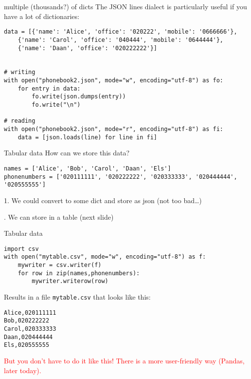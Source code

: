 \begin{frame}[fragile]{multiple (thousands?) of dicts}
The JSON lines dialect is particularly useful if you have a lot of dictionaries:

\begin{lstlisting}
data = [{'name': 'Alice', 'office': '020222', 'mobile': '0666666'},
	{'name': 'Carol', 'office': '040444', 'mobile': '0644444'},
	{'name': 'Daan', 'office': '020222222'}]


# writing
with open("phonebook2.json", mode="w", encoding="utf-8") as fo:
    for entry in data:
        fo.write(json.dumps(entry))
        fo.write("\n")
	
# reading
with open("phonebook2.json", mode="r", encoding="utf-8") as fi:
    data = [json.loads(line) for line in fi]
\end{lstlisting}

\end{frame}







\begin{frame}[fragile]{Tabular data}
How can we store this data?
\begin{lstlisting}
names = ['Alice', 'Bob', 'Carol', 'Daan', 'Els']
phonenumbers = ['020111111', '020222222', '020333333', '020444444', '020555555']
\end{lstlisting}
\pause

1. We could convert to some dict and store as json (not too bad\ldots)

. We can store in a table
(next slide)
\end{frame}

\begin{frame}[fragile]{Tabular data}
\begin{lstlisting}
import csv
with open("mytable.csv", mode="w", encoding="utf-8") as f:
    mywriter = csv.writer(f)
    for row in zip(names,phonenumbers):
        mywriter.writerow(row)
\end{lstlisting}
	
Results in a file \texttt{mytable.csv} that looks like this:
\begin{lstlisting}
Alice,020111111
Bob,020222222
Carol,020333333
Daan,020444444
Els,020555555
\end{lstlisting}
\pause
\textcolor{red}{But you don't have to do it like this! There is a more user-friendly way (Pandas, later today).}
\end{frame}


